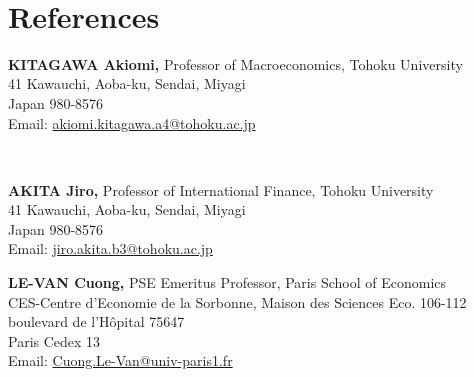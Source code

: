 \documentclass[margin,line]{res}
\begin{document}
\begin{resume}
 \\


\section{\sc References}
\vspace*{.05in}
\parbox{\textwidth}{
{\bf KITAGAWA Akiomi,} Professor of Macroeconomics, Tohoku University \\
41 Kawauchi, Aoba-ku, Sendai, Miyagi \\
Japan 980-8576 \\
Email: \href{mailto:akiomi.kitagawa.a4@tohoku.ac.jp}{akiomi.kitagawa.a4@tohoku.ac.jp}} \\

\par
\parbox{\textwidth}{
{\bf AKITA Jiro,} Professor of International Finance, Tohoku University\\
41 Kawauchi, Aoba-ku, Sendai, Miyagi \\
Japan 980-8576 \\
Email: \href{mailto:jiro.akita.b3@tohoku.ac.jp}{jiro.akita.b3@tohoku.ac.jp}}

\par
\parbox{\textwidth}{
{\bf LE-VAN Cuong,} PSE Emeritus Professor, Paris School of Economics\\
CES-Centre d'Economie de la Sorbonne, Maison des Sciences Eco. 106-112 boulevard de l'Hôpital 75647 \\
Paris Cedex 13 \\
Email: \href{mailto:Cuong.Le-Van@univ-paris1.fr}{Cuong.Le-Van@univ-paris1.fr}}


\end{resume}
\end{document}
